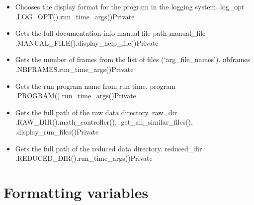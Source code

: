 \begin{itemize}
\item {}
{Chooses the display format for the program in the logging system.}
{log\_opt}
{\AllRecipes}{\spirouCONST.LOG\_OPT()}{\spirouStartup.run\_time\_args()}{Private}


\item {}
{Gets the full documentation info manual file path}
{manual\_file}
{\AllRecipes}{\spirouCONST.MANUAL\_FILE()}{\spirouStartup.display\_help\_file()}{Private}


\item {}
{Gets the number of frames from the list of files (`arg\_file\_names').}
{nbframes}
{\AllRecipes}{\spirouCONST.NBFRAMES}{\spirouStartup.run\_time\_args()}{Private}


\item {}
{Gets the run program name from run time.}
{program}
{\AllRecipes}{\spirouCONST.PROGRAM()}{\spirouStartup.run\_time\_args()}{Private}


\item {}
{Gets the full path of the raw data directory.}
{raw\_dir}
{\AllRecipes}{\spirouCONST.RAW\_DIR()}{\spirouFITS.math\_controller(), \spirouImage.get\_all\_similar\_files(), \spirouStartup.display\_run\_files()}{Private}


\item {}
{Gets the full path of the reduced data directory.}
{reduced\_dir}
{\AllRecipes}{\spirouCONST.REDUCED\_DIR()}{\spirouStartup.run\_time\_args()}{Private}

\end{itemize}

\fi



\ifdevguide

\clearpage
\newpage
\section{Formatting variables}
\label{ch:variables:formatting}

